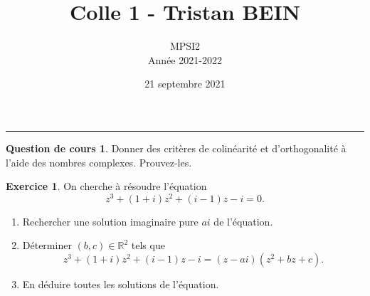 \documentclass[a4paper, 11pt,openany]{article}%
\title{Colle 1 - Tristan BEIN}
\author{MPSI2\\
Année 2021-2022}
\date{21 septembre 2021}
\theoremstyle{plain}
\theoremstyle{definition}
\newtheorem{cours}{Question de cours}
\newtheorem{exo}{Exercice}
\newtheorem{sol}{Solution de l'exercice}
\theoremstyle{remark}
\newcommand{\R}{\mathbb{R}}
\begin{document}
   \maketitle
      \rule{\linewidth}{0.5mm}

\begin{cours}
Donner des critères de colinéarité et d'orthogonalité à l'aide des nombres complexes. Prouvez-les.
\end{cours}

\begin{exo}
On cherche à résoudre l'équation 
\[ z^3+ (1+i)z^2+(i-1)z-i=0.\]
\begin{enumerate}
\item Rechercher une solution imaginaire pure $ai$ de l'équation.
\item Déterminer $(b,c) \in \R^2$ tels que
\[ z^3 + (1+i)z^2+(i-1)z-i= (z-ai)(z^2 + bz +c).\]
\item En déduire toutes les solutions de l'équation.
\end{enumerate}
\end{exo}


\end{document}
